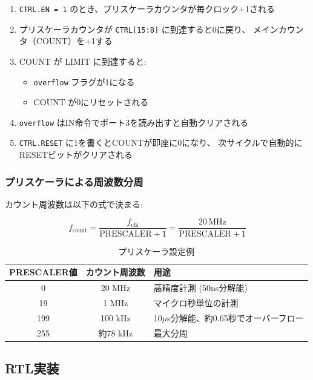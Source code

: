\documentclass[a4paper,11pt]{ltjsarticle}
\begin{document}
\begin{enumerate}
\item \texttt{CTRL.EN = 1} のとき、プリスケーラカウンタが毎クロック+1される
\item プリスケーラカウンタが \texttt{CTRL[15:8]} に到達すると0に戻り、
      メインカウンタ（COUNT）を+1する
\item COUNT が LIMIT に到達すると:
  \begin{itemize}
  \item \texttt{overflow} フラグが1になる
  \item COUNT が0にリセットされる
  \end{itemize}
\item \texttt{overflow} はIN命令でポート3を読み出すと自動クリアされる
\item \texttt{CTRL.RESET} に1を書くとCOUNTが即座に0になり、
      次サイクルで自動的にRESETビットがクリアされる
\end{enumerate}

\subsubsection{プリスケーラによる周波数分周}

カウント周波数は以下の式で決まる:

\[
f_{\mathrm{count}} = \frac{f_{\mathrm{clk}}}{\mathrm{PRESCALER} + 1} = \frac{20\,\mathrm{MHz}}{\mathrm{PRESCALER} + 1}
\]

\begin{table}[h]
\centering
\caption{プリスケーラ設定例}
\begin{tabular}{ccl}
\toprule
PRESCALER値 & カウント周波数 & 用途 \\
\midrule
0   & 20 MHz  & 高精度計測 (50ns分解能) \\
19  & 1 MHz   & マイクロ秒単位の計測 \\
199 & 100 kHz & 10$\mu$s分解能、約0.65秒でオーバーフロー \\
255 & 約78 kHz & 最大分周 \\
\bottomrule
\end{tabular}
\end{table}

\subsection{RTL実装}


\end{document}
